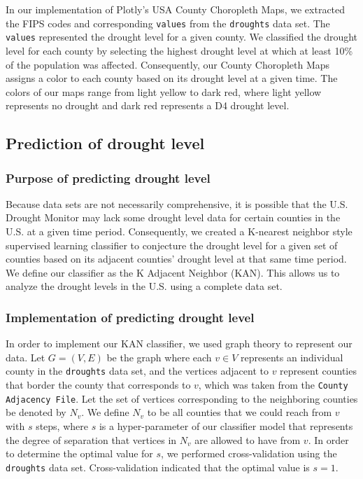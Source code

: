 \documentclass{article}
\begin{document}
In our implementation of Plotly's USA County Choropleth Maps, we extracted the FIPS codes and corresponding \texttt{values} from the \texttt{droughts} data set. The \texttt{values} represented the drought level for a given county. We classified the drought level for each county by selecting the highest drought level at which at least 10\% of the population was affected. Consequently, our County Choropleth Maps assigns a color to each county based on its drought level at a given time. The colors of our maps range from light yellow to dark red, where light yellow represents no drought and dark red represents a D4 drought level.
\subsection{Prediction of drought level}
\subsubsection{Purpose of predicting drought level}
Because data sets are not necessarily comprehensive, it is possible that the U.S. Drought Monitor may lack some drought level data for certain counties in the U.S. at a given time period. Consequently, we created a K-nearest neighbor style supervised learning classifier to conjecture the drought level for a given set of counties based on its adjacent counties' drought level at that same time period. We define our classifier as the K Adjacent Neighbor (KAN). This allows us to analyze the drought levels in the U.S. using a complete data set.
\subsubsection{Implementation of predicting drought level}
In order to implement our KAN classifier, we used graph theory to represent our data. Let $G = (V, E)$ be the graph where each $v \in V$ represents an individual county in the \texttt{droughts} data set, and the vertices adjacent to $v$ represent counties that border the county that corresponds to $v$, which was taken from the \texttt{County Adjacency File}. Let the set of vertices corresponding to the neighboring counties be denoted by $N_v$. We define $N_v$ to be all counties that we could reach from $v$ with $s$ steps, where $s$ is a hyper-parameter of our classifier model that represents the degree of separation that vertices in $N_v$ are allowed to have from $v$. In order to determine the optimal value for $s$, we performed cross-validation using the \texttt{droughts} data set. Cross-validation indicated that the optimal value is $s=1$.
\end{document}
